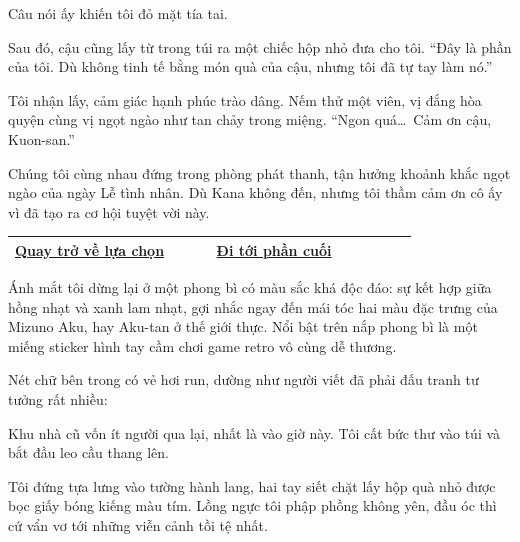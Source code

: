 \documentclass[../main.tex]{subfiles}
\begin{document}
Câu nói ấy khiến tôi đỏ mặt tía tai.

Sau đó, cậu cũng lấy từ trong túi ra một chiếc hộp nhỏ đưa cho tôi. ``Đây là phần của tôi. Dù không tinh tế bằng món quà của cậu, nhưng tôi đã tự tay làm nó.''

Tôi nhận lấy, cảm giác hạnh phúc trào dâng. Nếm thử một viên, vị đắng hòa quyện cùng vị ngọt ngào như tan chảy trong miệng. ``Ngon quá\dots\ Cảm ơn cậu, Kuon-san.''

Chúng tôi cùng nhau đứng trong phòng phát thanh, tận hưởng khoảnh khắc ngọt ngào của ngày Lễ tình nhân. Dù Kana không đến, nhưng tôi thầm cảm ơn cô ấy vì đã tạo ra cơ hội tuyệt vời này.

\begin{table}[H]
  \centering
  \setlength{\arrayrulewidth}{1pt}
  \begin{tabular}{|>{\centering\arraybackslash}p{0.4\linewidth}|>{\centering\arraybackslash}p{0.4\linewidth}|}
    \hline
    \hyperref[choice]{Quay trở về lựa chọn} & \hyperref[ending]{Đi tới phần cuối} \\ \hline
  \end{tabular}
\end{table}

\newpage
\label{aku}

Ánh mắt tôi dừng lại ở một phong bì có màu sắc khá độc đáo: sự kết hợp giữa hồng nhạt và xanh lam nhạt, gợi nhắc ngay đến mái tóc hai màu đặc trưng của Mizuno Aku, hay Aku-tan ở thế giới thực. Nổi bật trên nắp phong bì là một miếng sticker hình tay cầm chơi game retro vô cùng dễ thương.

Nét chữ bên trong có vẻ hơi run, dường như người viết đã phải đấu tranh tư tưởng rất nhiều:


Khu nhà cũ vốn ít người qua lại, nhất là vào giờ này. Tôi cất bức thư vào túi và bắt đầu leo cầu thang lên.

\ct


Tôi đứng tựa lưng vào tường hành lang, hai tay siết chặt lấy hộp quà nhỏ được bọc giấy bóng kiếng màu tím. Lồng ngực tôi phập phồng không yên, đầu óc thì cứ vẩn vơ tới những viễn cảnh tồi tệ nhất.
\end{document}
